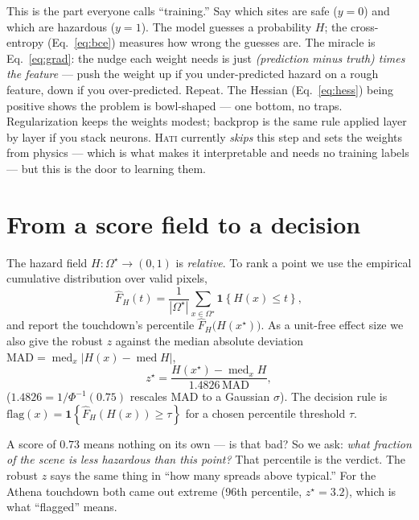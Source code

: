 \documentclass[11pt]{article}
\theoremstyle{definition}
\newcommand{\abs}[1]{\left\lvert #1 \right\rvert}
\newcommand{\set}[1]{\left\{ #1 \right\}}
\newcommand{\med}{\operatorname{med}}
\begin{document}
\begin{words}
This is the part everyone calls ``training.'' Say which sites are safe ($y{=}0$) and
which are hazardous ($y{=}1$). The model guesses a probability $H$; the cross-entropy
(Eq.~\ref{eq:bce}) measures how wrong the guesses are. The miracle is
Eq.~\eqref{eq:grad}: the nudge each weight needs is just \emph{(prediction minus
truth) times the feature} --- push the weight up if you under-predicted hazard on a
rough feature, down if you over-predicted. Repeat. The Hessian
(Eq.~\ref{eq:hess}) being positive shows the problem is bowl-shaped --- one bottom,
no traps. Regularization keeps the weights modest; backprop is the same rule applied
layer by layer if you stack neurons. \textsc{Hati} currently \emph{skips} this step
and sets the weights from physics --- which is what makes it interpretable and
needs no training labels --- but this is the door to learning them.
\end{words}

\section{From a score field to a decision}

The hazard field $H:\Omega^\star\to(0,1)$ is \emph{relative}. To rank a point we use
the empirical cumulative distribution over valid pixels,
\begin{equation}
\widehat F_H(t)=\frac{1}{\abs{\Omega^\star}}\sum_{x\in\Omega^\star}\mathbf 1\!\set{H(x)\le t},
\end{equation}
and report the touchdown's percentile $\widehat F_H\!\big(H(x^\star)\big)$. As a unit-free
effect size we also give the robust $z$ against the median absolute deviation
$\mathrm{MAD}=\med_x\abs{H(x)-\med H}$,
\begin{equation}
z^\star=\frac{H(x^\star)-\med_x H}{1.4826\,\mathrm{MAD}},
\end{equation}
($1.4826=1/\Phi^{-1}(0.75)$ rescales MAD to a Gaussian $\sigma$). The decision rule
is $\text{flag}(x)=\mathbf 1\set{\widehat F_H(H(x))\ge\tau}$ for a chosen percentile
threshold $\tau$.

\begin{words}
A score of $0.73$ means nothing on its own --- is that bad? So we ask: \emph{what
fraction of the scene is less hazardous than this point?} That percentile is the
verdict. The robust $z$ says the same thing in ``how many spreads above typical.''
For the Athena touchdown both came out extreme (96th percentile, $z^\star=3.2$),
which is what ``flagged'' means.
\end{words}
\end{document}
